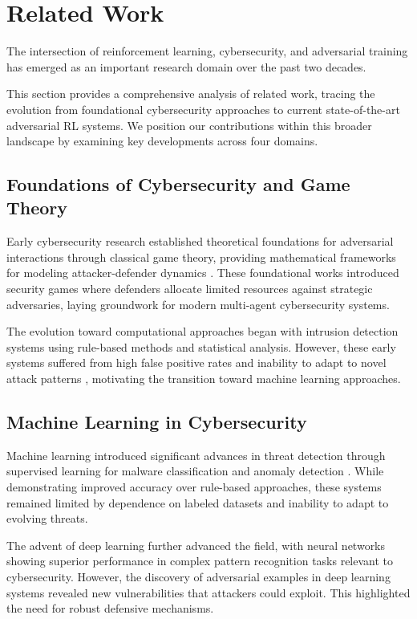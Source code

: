 \documentclass[12pt,oneside]{article}
\begin{document}
\section{Related Work}

The intersection of reinforcement learning, cybersecurity, and adversarial training has emerged as an important research domain over the past two decades. 

This section provides a comprehensive analysis of related work, tracing the evolution from foundational cybersecurity approaches to current state-of-the-art adversarial RL systems. We position our contributions within this broader landscape by examining key developments across four domains.

\subsection{Foundations of Cybersecurity and Game Theory}

Early cybersecurity research established theoretical foundations for adversarial interactions through classical game theory, providing mathematical frameworks for modeling attacker-defender dynamics \cite{alpcan2010network}. These foundational works introduced security games where defenders allocate limited resources against strategic adversaries, laying groundwork for modern multi-agent cybersecurity systems.

The evolution toward computational approaches began with intrusion detection systems using rule-based methods and statistical analysis. However, these early systems suffered from high false positive rates and inability to adapt to novel attack patterns \cite{sommer2010outside}, motivating the transition toward machine learning approaches.

\subsection{Machine Learning in Cybersecurity}

Machine learning introduced significant advances in threat detection through supervised learning for malware classification and anomaly detection \cite{sommer2010outside}. While demonstrating improved accuracy over rule-based approaches, these systems remained limited by dependence on labeled datasets and inability to adapt to evolving threats.

The advent of deep learning further advanced the field, with neural networks showing superior performance in complex pattern recognition tasks relevant to cybersecurity. However, the discovery of adversarial examples in deep learning systems \cite{goodfellow2014explaining} revealed new vulnerabilities that attackers could exploit. This highlighted the need for robust defensive mechanisms.
\end{document}
